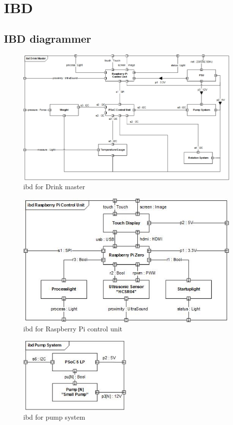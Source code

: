 \section{IBD}
\subsection{IBD diagrammer}

\begin{figure}[h]
	\centering
	\includegraphics[width=1\textwidth]{Images/Hardwarearkitektur/IBD_System_JPEG.jpg}
	\caption{ibd for Drink master}
	\label{fig:ibd}
\end{figure}
\FloatBarrier

\begin{figure}[h]
	\centering
	\includegraphics[width=1\textwidth]{Images/Hardwarearkitektur/IBD_Raspberry_Pi_Control_Unit_JPEG.jpg}
	\caption{ibd for Raspberry Pi control unit}
	\label{fig:ibd_rasp}
\end{figure}
\FloatBarrier

\begin{figure}[h]
	\centering
	\includegraphics[width=0.5\textwidth]{Images/Hardwarearkitektur/IBD_Pump_System_JPEG.jpg}
	\caption{ibd for pump system}
	\label{fig:ibd_pump}
\end{figure}
\FloatBarrier

